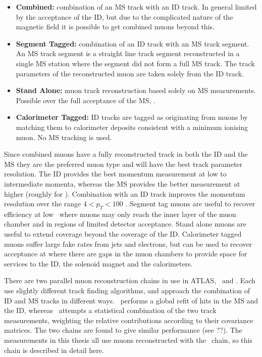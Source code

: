 \begin{itemize}

    \item {\bf Combined:} combination of an MS track with an ID track. In
    general limited by the acceptance of the ID,  but due to the complicated
    nature of the magnetic field it is possible to get combined muons beyond
    this.

    \item {\bf Segment Tagged:} combination of an ID track with an MS track
    segment. An MS track segment is a straight line track segment reconstructed
    in a single MS station where the segment did not form a full MS track. The
    track parameters of the reconstructed muon are taken solely from the ID
    track.

    \item {\bf Stand Alone:} muon track reconstruction based solely on 
    MS measurements. Possible over the full acceptance of the MS,
    .

    \item {\bf Calorimeter Tagged:} ID tracks are tagged as originating from
    muons by matching them to calorimeter deposits consistent with a minimum ionising
    muon. No MS tracking is used.


\end{itemize}

Since combined muons have a fully reconstructed track in both the ID and the MS
they are the preferred muon type and will have the best track parameter
resolution. The ID provides the best momentum measurement at low to intermediate
momenta, whereas the MS provides the better measurement at higher \pt (roughly
for ). Combination with an ID track improves the momentum resolution
over the range $4 < p_{T} < 100$ \GeV. Segment tag muons are useful to recover
efficiency at low \pt\ where muons may only reach the inner layer of the muon
chamber and in regions of limited detector acceptance. Stand alone muons are
useful to extend coverage beyond the coverage of the ID. Calorimeter tagged
muons suffer large fake rates from jets and electrons, but can be used to recover
acceptance at  where there are gaps in the muon chambers to
provide space for services to the ID, the solenoid magnet and the calorimeters.

There are two parallel muon reconstruction chains in use in ATLAS, \staco\ and
\muid. Each use slightly different track finding algorithms, and approach the
combination of ID and MS tracks in different ways. \muid\ performs a global
refit of hits in the MS and the ID, whereas \staco\ attempts a statistical
combination of the two track measurements, weighting the relative contributions
according to their covariance matrices. The two chains are found to give similar
performance (see ??). The measurements in this thesis all use muons
reconstructed with the \staco\ chain, so this chain is described in detail here.

